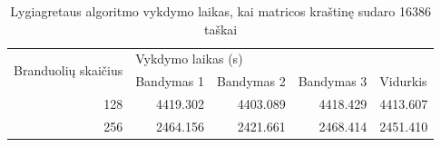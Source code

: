 \documentclass{VUMIFPSbakalaurinis}
\begin{document}
\begin{table}[]
    \begin{tabular}{|l|lrrr|}
        \hline
        \multirow{2}{*}{Branduolių skaičius} & \multicolumn{4}{l|}{Vykdymo laikas (s)}                                                                                                     \\ \cline{2-5}
                                             & \multicolumn{1}{l|}{Bandymas 1}         & \multicolumn{1}{l|}{Bandymas 2} & \multicolumn{1}{l|}{Bandymas 3} & \multicolumn{1}{l|}{Vidurkis} \\ \hline
        \multicolumn{1}{|r|}{128}            & \multicolumn{1}{r|}{4419.302}           & \multicolumn{1}{r|}{4403.089}   & \multicolumn{1}{r|}{4418.429}   & 4413.607                      \\ \hline
        \multicolumn{1}{|r|}{256}            & \multicolumn{1}{r|}{2464.156}           & \multicolumn{1}{r|}{2421.661}   & \multicolumn{1}{r|}{2468.414}   & 2451.410                      \\ \hline
        
    \end{tabular}
    \caption{Lygiagretaus algoritmo vykdymo laikas, kai matricos kraštinę sudaro 16386 taškai}
    \label{table:parallel16386}
\end{table}
\end{document}
